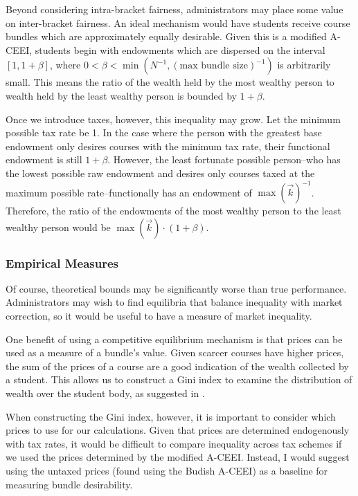 \documentclass{article}
\begin{document}
Beyond considering intra-bracket fairness, administrators may place some value on inter-bracket fairness. An ideal mechanism would have students receive course bundles which are approximately equally desirable. Given this is a modified A-CEEI, students begin with endowments which are dispersed on the interval $[1, 1 + \beta]$, where $0 < \beta < \min\left(N^{-1}, (\mbox{max bundle size})^{-1}\right)$ is arbitrarily small. This means the ratio of the wealth held by the most wealthy person to wealth held by the least wealthy person is bounded by $1 + \beta$.

Once we introduce taxes, however, this inequality may grow. Let the minimum possible tax rate be 1. In the case where the person with the greatest base endowment only desires courses with the minimum tax rate, their functional endowment is still $1 + \beta$. However, the least fortunate possible person--who has the lowest possible raw endowment and desires only courses taxed at the maximum possible rate--functionally has an endowment of $\max(\vec{k})^{-1}$. Therefore, the ratio of the endowments of the most wealthy person to the least wealthy person would be $\max(\vec{k}) \cdot (1 + \beta)$.

\subsubsection{Empirical Measures}

Of course, theoretical bounds may be significantly worse than true performance. Administrators may wish to find equilibria that balance inequality with market correction, so it would be useful to have a measure of market inequality. 

One benefit of using a competitive equilibrium mechanism is that prices can be used as a measure of a bundle's value. Given scarcer courses have higher prices, the sum of the prices of a course are a good indication of the wealth collected by a student. This allows us to construct a Gini index to examine the distribution of wealth over the student body, as suggested in \textcite{budish2016}.

When constructing the Gini index, however, it is important to consider which prices to use for our calculations. Given that prices are determined endogenously with tax rates, it would be difficult to compare inequality across tax schemes if we used the prices determined by the modified A-CEEI. Instead, I would suggest using the untaxed prices (found using the Budish A-CEEI) as a baseline for measuring bundle desirability.
\end{document}
